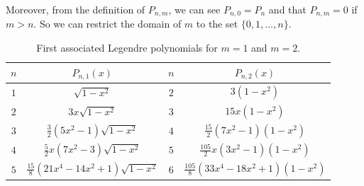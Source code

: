 \documentclass[../main.tex]{subfiles}
\begin{document}
Moreover, from the definition of $P_{n,m}$, we can see $P_{n,0}=P_n$ and that $P_{n,m}=0$ if $m>n$. So we can restrict the domain of $m$ to the set $\{0,1,\dots,n\}$.

\begin{table}[ht]
  \centering
  \captionsetup{type=table} %
  \begin{tabular}{c|c||c|c}
    $n$ & $P_{n,1}(x)$                              & $n$ & $P_{n,2}(x)$                          \\
    \hline
    $1$ & $\sqrt{1-x^2}$                            & $2$ & $3(1-x^2)$                            \\
    $2$ & $3x\sqrt{1-x^2}$                          & $3$ & $15x(1-x^2)$                          \\
    $3$ & $\frac{3}{2}(5 x^2-1)\sqrt{1-x^2}$        & $4$ & $\frac{15}{2}(7x^2-1)(1-x^2)$         \\
    $4$ & $\frac{5}{2}x(7x^2-3)\sqrt{1-x^2}$        & $5$ & $\frac{105}{2}x(3x^2-1)(1-x^2)$       \\
    $5$ & $\frac{15}{8}(21x^4-14x^2+1)\sqrt{1-x^2}$ & $6$ & $\frac{105}{8}(33x^4-18x^2+1)(1-x^2)$ \\
  \end{tabular}
  \caption{First associated Legendre polynomials for $m=1$ and $m=2$.}
\end{table}
\end{document}
